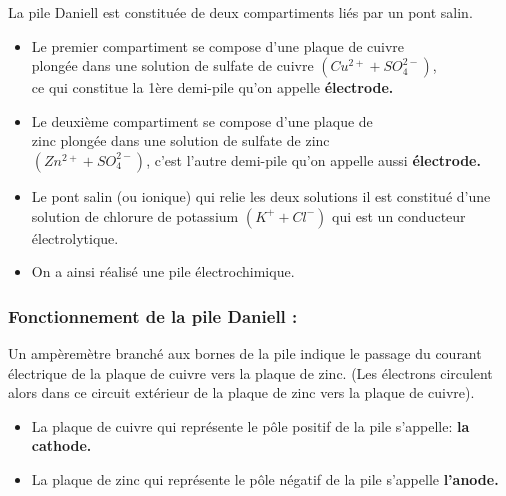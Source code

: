 \documentclass[12pt]{article}
\begin{document}
\begin{figure}
\begin{center}
\end{center}
\end{figure}
La pile Daniell est constituée de deux compartiments liés par un pont salin.
\begin{itemize}
	\item Le premier compartiment se compose d'une plaque de cuivre \\plongée dans une solution de sulfate de cuivre $(Cu^{2+} + SO_4^{2-})$, \\ce qui constitue la 1ère demi-pile qu'on appelle \textbf{électrode.}

	\item Le deuxième compartiment se compose d'une plaque de \\zinc plongée dans une solution de sulfate de zinc \\$(Zn^{2+}+SO_4^{2-})$, c'est l'autre demi-pile qu'on appelle aussi \textbf{électrode.}

	\item Le pont salin (ou ionique) qui relie les deux solutions il est constitué d'une solution de chlorure de potassium $(K^+ + Cl^-)$ qui est un conducteur électrolytique.

	\item On a ainsi réalisé une pile électrochimique.
\end{itemize}

\subsubsection{Fonctionnement de la pile Daniell : }

Un ampèremètre branché aux bornes de la pile indique le passage du courant électrique de la plaque de cuivre vers la plaque
de zinc. (Les électrons circulent alors dans ce circuit extérieur de la plaque de zinc vers la plaque de cuivre).
\begin{itemize}
	\item La plaque de cuivre qui représente le pôle positif de la pile s'appelle: \textbf{la cathode.}
\item La plaque de zinc qui représente le pôle négatif de la pile s'appelle \textbf{l'anode.}

\end{itemize}
\end{document}
